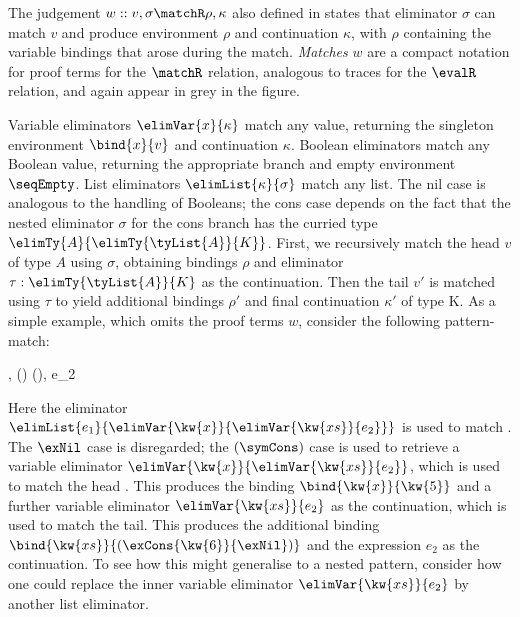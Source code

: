 The judgement $w :: v, \sigma \matchR \rho, \kappa$ also defined in  states that eliminator $\sigma$ can match $v$ and produce environment $\rho$ and continuation $\kappa$, with $\rho$ containing the variable bindings that arose during the match. \emph{Matches} $w$ are a compact notation for proof terms for the $\matchR$ relation, analogous to traces for the $\evalR$ relation, and again appear in grey in the figure.

Variable eliminators $\elimVar{x}{\kappa}$ match any value, returning the singleton environment $\bind{x}{v}$ and continuation $\kappa$. Boolean eliminators match any Boolean value, returning the appropriate branch and empty environment $\seqEmpty$. List eliminators $\elimList{\kappa}{\sigma}$ match any list. The nil case is analogous to the handling of Booleans; the cons case depends on the fact that the nested eliminator $\sigma$ for the cons branch has the curried type $\elimTy{A}{\elimTy{\tyList{A}}{K}}$. First, we recursively match the head $v$ of type $A$ using $\sigma$, obtaining bindings $\rho$ and eliminator $\tau: \elimTy{\tyList{A}}{K}$ as the continuation. Then the tail $v'$ is matched using $\tau$ to yield additional bindings $\rho'$ and final continuation $\kappa'$ of type K. As a simple example, which omits the proof terms $w$, consider the following pattern-match:

\begin{smathpar}
   {
         , 
         \matchR
         () \concat (), e_2
   }
\end{smathpar}

\noindent Here the eliminator $\elimList{e_1}{\elimVar{\kw{x}}{\elimVar{\kw{xs}}{e_2}}}$ is used to match . The $\exNil$ case is disregarded; the $(\symCons)$ case is used to retrieve a variable eliminator $\elimVar{\kw{x}}{\elimVar{\kw{xs}}{e_2}}$, which is used to match the head . This produces the binding $\bind{\kw{x}}{\kw{5}}$ and a further variable eliminator $\elimVar{\kw{xs}}{e_2}$ as the continuation, which is used to match the tail. This produces the additional binding $\bind{\kw{xs}}{(\exCons{\kw{6}}{\exNil})}$ and the expression $e_2$ as the continuation. To see how this might generalise to a nested pattern, consider how one could replace the inner variable eliminator $\elimVar{\kw{xs}}{e_2}$ by another list eliminator.

